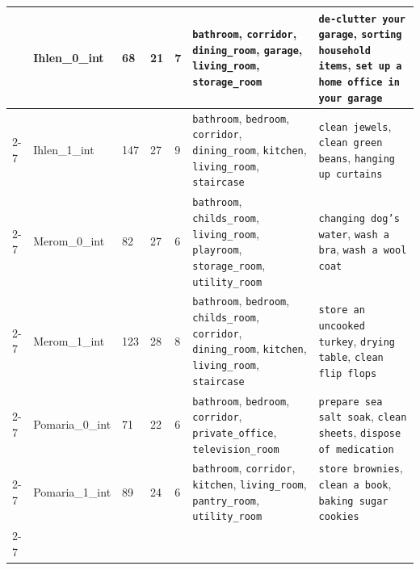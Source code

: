 {\begin{longtable}{|m{}|m{}|m{}|m{}|m{}|m{}|m{}|}
& Ihlen\_0\_int                         & 68           & 21           & 7          & \texttt{bathroom}, \texttt{corridor}, \texttt{dining\_room}, \texttt{garage}, \texttt{living\_room}, \texttt{storage\_room}                                                                            & \texttt{de-clutter your garage}, \texttt{sorting household items}, \texttt{set up a home office in your garage}      \\ \cline{2-7} 
& Ihlen\_1\_int                         & 147          & 27           & 9          & \texttt{bathroom}, \texttt{bedroom}, \texttt{corridor}, \texttt{dining\_room}, \texttt{kitchen}, \texttt{living\_room}, \texttt{staircase}                                                                      & \texttt{clean jewels}, \texttt{clean green beans}, \texttt{hanging up curtains}      \\ \cline{2-7} 
& Merom\_0\_int                         & 82           & 27           & 6          & \texttt{bathroom}, \texttt{childs\_room}, \texttt{living\_room}, \texttt{playroom}, \texttt{storage\_room}, \texttt{utility\_room}                                                                     & \texttt{changing dog's water}, \texttt{wash a bra}, \texttt{wash a wool coat}      \\ \cline{2-7} 
& Merom\_1\_int                         & 123          & 28           & 8          & \texttt{bathroom}, \texttt{bedroom}, \texttt{childs\_room}, \texttt{corridor}, \texttt{dining\_room}, \texttt{kitchen}, \texttt{living\_room}, \texttt{staircase}                                                        & \texttt{store an uncooked turkey}, \texttt{drying table}, \texttt{clean flip flops}      \\ \cline{2-7} 
& Pomaria\_0\_int                       & 71           & 22           & 6          & \texttt{bathroom}, \texttt{bedroom}, \texttt{corridor}, \texttt{private\_office}, \texttt{television\_room }                                                                                  & \texttt{prepare sea salt soak}, \texttt{clean sheets}, \texttt{dispose of medication}      \\ \cline{2-7} 
& Pomaria\_1\_int                       & 89           & 24           & 6          & \texttt{bathroom}, \texttt{corridor}, \texttt{kitchen}, \texttt{living\_room}, \texttt{pantry\_room}, \texttt{utility\_room}                                                                           & \texttt{store brownies}, \texttt{clean a book}, \texttt{baking sugar cookies}      \\ \cline{2-7} 

\end{longtable}}
